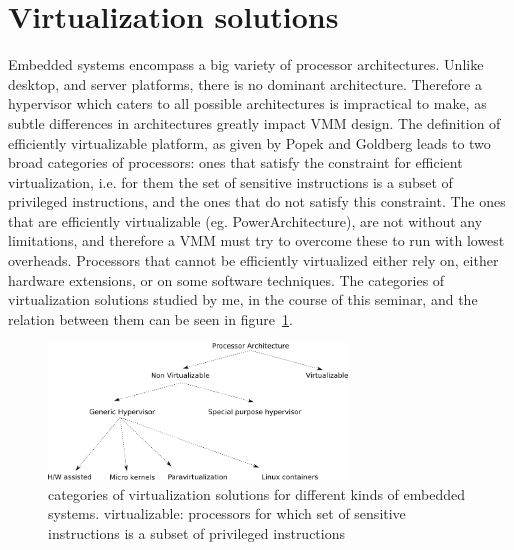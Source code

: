 \documentclass[seminar,twoside]{iitbreport}
\begin{document}
\section{Virtualization solutions}
Embedded systems encompass a big variety of processor architectures. Unlike desktop, and server platforms, there is no dominant architecture. 
Therefore a hypervisor which caters to all possible architectures is impractical to make, as subtle differences in architectures greatly impact VMM design. The definition of efficiently virtualizable platform, as given by Popek and Goldberg\cite{Popek:1974:FRV:361011.361073} leads to
 two broad categories of processors: ones that satisfy the constraint for efficient virtualization, i.e. for them the set of sensitive instructions is a subset of privileged instructions, 
 and the ones that do not satisfy this constraint. The ones that are efficiently virtualizable (eg. PowerArchitecture), are not without any limitations, and therefore a VMM must try to overcome these
 to run with lowest overheads. Processors that cannot be efficiently virtualized either rely on, either hardware extensions, or on some software techniques. The categories of
 virtualization solutions studied by me, in the course of this seminar, and the relation between them can be seen in figure~\ref{fig:papers}.
\\
 \begin{figure}[ht]
 \centering
 \includegraphics[width=300px]{papers}
 \caption{categories of virtualization solutions for different kinds of embedded systems. \footnotesize{ virtualizable: processors for which set of sensitive instructions is a subset of
 privileged instructions} \label{fig:papers}}
 \end{figure}
    
\end{document}
